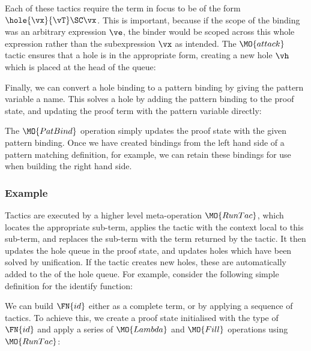 Each of these tactics require the term in focus to be of the form $\hole{\vx}{\vT}\SC\vx$.
This is important, because if the scope of the binding was an arbitrary expression $\ve$,
the binder would be scoped across this whole expression rather than the subexpression
$\vx$ as intended.
The $\MO{attack}$ tactic ensures that a hole
is in the appropriate form, creating a new hole $\vh$ which is placed at the head
of the queue:


Finally, we can convert a hole binding to a pattern binding by giving the 
pattern variable a name. This solves a hole
by adding the pattern binding to the proof state, and updating the proof term
with the pattern variable directly:


The $\MO{PatBind}$ operation simply updates the proof state with the given pattern
binding. Once we have created bindings from the left hand side of a pattern
matching definition, for example, we can retain these bindings for use when
building the right hand side.

\subsubsection{Example}

Tactics are executed by a higher level meta-operation $\MO{RunTac}$, which
locates the appropriate sub-term, applies the tactic with the context
local to this sub-term, and
replaces the sub-term with the term returned by the
tactic. It then updates the hole queue in the proof state, and updates holes which have
been solved by unification. If the tactic creates new holes, these are automatically
added to the  of the hole queue.
For example, consider the following simple
\TT{} definition for the identify function:


We can build $\FN{id}$ either as a complete term, or by applying a sequence of tactics.
To achieve this, we create a proof state initialised with the type of $\FN{id}$ and
apply a series of $\MO{Lambda}$ and $\MO{Fill}$ operations using $\MO{RunTac}$:


